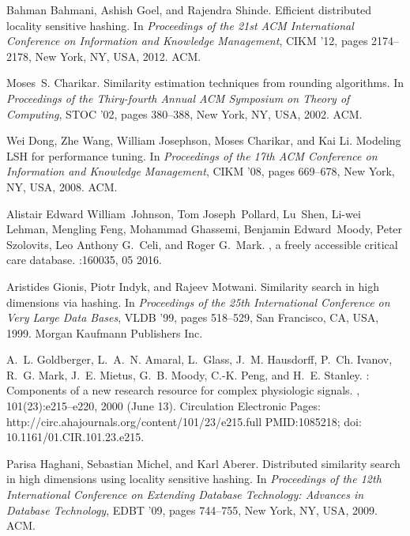 \documentclass{article}
\begin{document}
\begin{thebibliography}{10}

Bahman Bahmani, Ashish Goel, and Rajendra Shinde.
\newblock Efficient distributed locality sensitive hashing.
\newblock In {\em Proceedings of the 21st ACM International Conference on
  Information and Knowledge Management}, CIKM '12, pages 2174--2178, New York,
  NY, USA, 2012. ACM.

Moses~S. Charikar.
\newblock Similarity estimation techniques from rounding algorithms.
\newblock In {\em Proceedings of the Thiry-fourth Annual ACM Symposium on
  Theory of Computing}, STOC '02, pages 380--388, New York, NY, USA, 2002. ACM.

Wei Dong, Zhe Wang, William Josephson, Moses Charikar, and Kai Li.
\newblock Modeling {LSH} for performance tuning.
\newblock In {\em Proceedings of the 17th ACM Conference on Information and
  Knowledge Management}, CIKM '08, pages 669--678, New York, NY, USA, 2008.
  ACM.

Alistair Edward William~Johnson, Tom Joseph~Pollard, Lu~Shen, Li-wei Lehman,
  Mengling Feng, Mohammad Ghassemi, Benjamin Edward~Moody, Peter Szolovits, Leo
  Anthony G.~Celi, and Roger G.~Mark.
, a freely accessible critical care database.
:160035, 05 2016.

Aristides Gionis, Piotr Indyk, and Rajeev Motwani.
\newblock Similarity search in high dimensions via hashing.
\newblock In {\em Proceedings of the 25th International Conference on Very
  Large Data Bases}, VLDB '99, pages 518--529, San Francisco, CA, USA, 1999.
  Morgan Kaufmann Publishers Inc.

A.~L. Goldberger, L.~A.~N. Amaral, L.~Glass, J.~M. Hausdorff, P.~Ch. Ivanov,
  R.~G. Mark, J.~E. Mietus, G.~B. Moody, C.-K. Peng, and H.~E. Stanley.
: Components of a new
  research resource for complex physiologic signals.
, 101(23):e215--e220, 2000 (June 13).
\newblock Circulation Electronic Pages:
  http://circ.ahajournals.org/content/101/23/e215.full PMID:1085218; doi:
  10.1161/01.CIR.101.23.e215.

Parisa Haghani, Sebastian Michel, and Karl Aberer.
\newblock Distributed similarity search in high dimensions using locality
  sensitive hashing.
\newblock In {\em Proceedings of the 12th International Conference on Extending
  Database Technology: Advances in Database Technology}, EDBT '09, pages
  744--755, New York, NY, USA, 2009. ACM.


\end{thebibliography}
\end{document}

